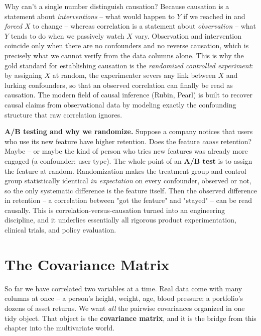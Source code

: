 \begin{happeningbox}
Why can't a single number distinguish causation? Because causation is a statement
about \emph{interventions} -- what would happen to $Y$ if we reached in and
\emph{forced} $X$ to change -- whereas correlation is a statement about
\emph{observation} -- what $Y$ tends to do when we passively watch $X$ vary.
Observation and intervention coincide only when there are no confounders and no
reverse causation, which is precisely what we cannot verify from the data columns
alone. This is why the gold standard for establishing causation is the
\emph{randomized controlled experiment}: by assigning $X$ at random, the
experimenter severs any link between $X$ and lurking confounders, so that an
observed correlation can finally be read as causation. The modern field of causal
inference (Rubin, Pearl) is built to recover causal claims from observational data
by modeling exactly the confounding structure that raw correlation ignores.
\end{happeningbox}

\begin{applicationbox}
\textbf{A/B testing and why we randomize.} Suppose a company notices that users who
use its new feature have higher retention. Does the feature \emph{cause} retention?
Maybe -- or maybe the kind of person who tries new features was already more engaged
(a confounder: user type). The whole point of an \textbf{A/B test} is to assign the
feature at random. Randomization makes the treatment group and control group
statistically identical \emph{in expectation} on every confounder, observed or not,
so the only systematic difference is the feature itself. Then the observed
difference in retention -- a correlation between "got the feature" and "stayed" --
can be read causally. This is correlation-versus-causation turned into an
engineering discipline, and it underlies essentially all rigorous product
experimentation, clinical trials, and policy evaluation.
\end{applicationbox}

\section{The Covariance Matrix}
\label{ch14:cov-matrix}

So far we have correlated two variables at a time. Real data come with many columns
at once -- a person's height, weight, age, blood pressure; a portfolio's dozens of
asset returns. We want \emph{all} the pairwise covariances organized in one tidy
object. That object is the \textbf{covariance matrix}, and it is the bridge from
this chapter into the multivariate world.

